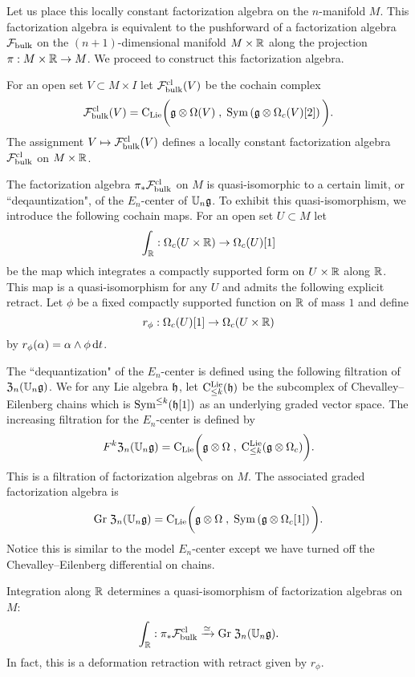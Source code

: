 \documentclass[11pt]{amsart}
\numberwithin{equation}{section}
\begin{document}
Let us place this locally constant factorization algebra on the $n$-manifold $M$.
This factorization algebra is equivalent to the pushforward of a factorization algebra $\mathcal F_{\rm bulk}$ on the $(n+1)$-dimensional manifold $M \times \mathbb R$ along the projection $\pi : M \times \mathbb R \to M$. 
We proceed to construct this factorization algebra. 

For an open set $V \subset M \times I$ let $\mathcal F^{\rm cl}_{\rm bulk} (V)$ be the cochain complex 
\[
\mathcal F^{\rm cl}_{\rm bulk} (V) = {\rm C}_{{\rm Lie}} \bigg(\mathfrak g \otimes \Omega (V) \; , \; {\rm Sym} \left(\mathfrak g \otimes \Omega_c(V) [2] \right) \bigg) .
\]
The assignment $V \mapsto \mathcal F^{\rm cl}_{\rm bulk}(V)$ defines a locally constant factorization algebra $\mathcal F^{\rm cl}_{\rm bulk}$ on $M \times \mathbb R$. 

The factorization algebra $\pi_* \mathcal F^{\rm cl}_{\rm bulk}$ on $M$ is quasi-isomorphic to a certain limit, or ``deqauntization", of the $E_n$-center of $\mathbb U_n \mathfrak g$. 
To exhibit this quasi-isomorphism, we introduce the following cochain maps.
For an open set $U \subset M$ let
\[
\int_\mathbb R : \Omega_c(U \times \mathbb R) \to \Omega_c (U) [1] 
\] 
be the map which integrates a compactly supported form on $U \times \mathbb R$ along $\mathbb R$. 
This map is a quasi-isomorphism for any $U $ and admits the following explicit retract. 
Let $\phi$ be a fixed compactly supported function on $\mathbb R$ of mass $1$ and define
\[
r_\phi : \Omega_c(U) [1] \to \Omega_c (U \times \mathbb R)
\]
by $r_\phi (\alpha) = \alpha \wedge \phi \, {\rm d} t$. 

The ``dequantization" of the $E_n$-center is defined using the following filtration of ${\frak Z}_n(\mathbb U_n \mathfrak g)$.
We for any Lie algebra $\mathfrak h$, let ${\rm C}^{\rm Lie}_{\leq k} (\mathfrak h)$ be the subcomplex of Chevalley--Eilenberg chains which is ${\rm Sym}^{\leq k} (\mathfrak h[1])$ as an underlying graded vector space. 
The increasing filtration for the $E_n$-center is defined by
\[
F^k {\frak Z}_n(\mathbb U_n \mathfrak g) = {\rm C}_{{\rm Lie}} \bigg(\mathfrak g \otimes \Omega \; , \; {\rm C}^{\rm Lie}_{\leq k} (\mathfrak g \otimes \Omega_c) \bigg) .
\]
This is a filtration of factorization algebras on $M$. 
The associated graded factorization algebra is
\[
{\rm Gr} \;  {\frak Z}_n(\mathbb U_n \mathfrak g)  = {\rm C}_{{\rm Lie}} \bigg(\mathfrak g \otimes \Omega \; , \; {\rm Sym} \left(\mathfrak g \otimes \Omega_c [1] \right) \bigg) .
\]
Notice this is similar to the model $E_n$-center except we have turned off the Chevalley--Eilenberg differential on chains. 

\begin{lmm}
Integration along $\mathbb R$ determines a quasi-isomorphism of factorization algebras on $M$:
\[
\int_\mathbb R : \pi_* \mathcal F^{\rm cl}_{\rm bulk} \xrightarrow{\simeq} {\rm Gr} \;  {\frak Z}_n(\mathbb U_n \mathfrak g) .
\]
In fact, this is a deformation retraction with retract given by $r_\phi$. 
\end{lmm}
 
\end{document}
